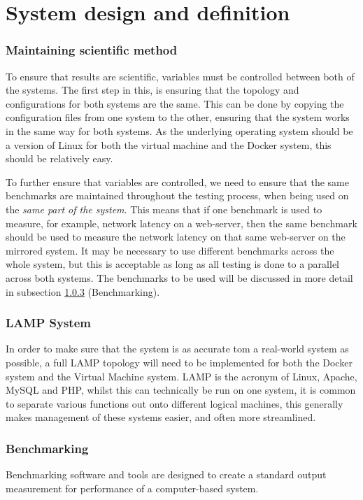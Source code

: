 \chapter{System design and definition}
\subsection{Maintaining scientific method}
To ensure that results are scientific, variables must be controlled between both of the systems. The first step in this, is ensuring that the topology and configurations for both systems are the same. This can be done by copying the configuration files from one system to the other, ensuring that the system works in the same way for both systems. As the underlying operating system should be a version of Linux for both the virtual machine and the Docker system, this should be relatively easy.

To further ensure that variables are controlled, we need to ensure that the same benchmarks are maintained throughout the testing process, when being used on the \emph{same part of the system}. This means that if one benchmark is used to measure, for example, network latency on a web-server, then the same benchmark should be used to measure the network latency on that same web-server on the mirrored system. It may be necessary to use different benchmarks across the whole system, but this is acceptable as long as all testing is done to a parallel across both systems. The benchmarks to be used will be discussed in more detail in subsection \ref{sub:Benchmarking} (Benchmarking).

\subsection{LAMP System}
In order to make sure that the system is as accurate tom a real-world system as possible, a full LAMP topology will need to be implemented for both the Docker system and the Virtual Machine system. LAMP is the acronym of Linux, Apache, MySQL and PHP, whilst this can technically be run on one system, it is common to separate various functions out onto different logical machines, this generally makes management of these systems easier, and often more streamlined.

\subsection{Benchmarking}
\label{sub:Benchmarking}
Benchmarking software and tools are designed to create a standard output measurement for performance of a computer-based system\citep{fleming1986}.

